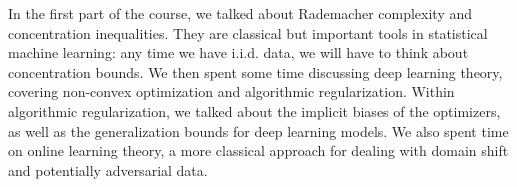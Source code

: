 
In the first part of the course, we talked about Rademacher complexity and concentration inequalities. They are classical but important tools in statistical machine learning: any time we have i.i.d. data, we will have to think about concentration bounds. We then spent some time discussing deep learning theory, covering non-convex optimization and algorithmic regularization. Within algorithmic regularization, we talked about the implicit biases of the optimizers, as well as the generalization bounds for deep learning models. We also spent time on online learning theory, a more classical approach for dealing with domain shift and potentially adversarial data.